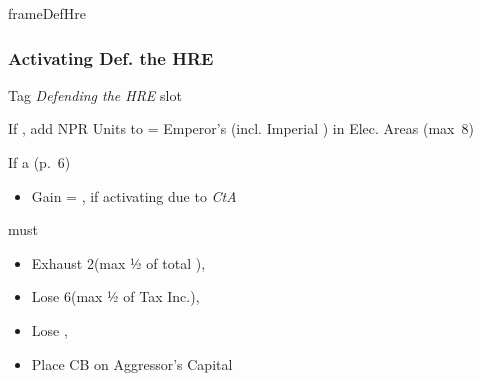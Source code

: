 \documentclass[10pt]{article}
\newlength{\fhDefHre} \setlength\fhDefHre{14\baselineskip}
\begin{document}
\begin{dynamiccontents*}{frameDefHre}
\begin{eubox}{\fhDefHre}
\begin{multicols}{2}
		\subsubsection*{Activating Def. the HRE }
		\begin{itemize}
			\item Tag \emph{Defending the HRE} slot
			\item If , add NPR Units to  \manpower = Emperor's \influence (incl. Imperial \influence) in Elec. Areas (max~8)
			{\botrules
			\item If a  (p.~6)
			\begin{itemize}
				\item Gain \botpower = \authority, if activating due to \emph{CtA}
			\end{itemize}
			}
			\item {} must
			\begin{itemize}
				\item Exhaust 2\manpower (max ½ of total \manpower), 
				\item Lose 6\ducats (max ½ of Tax Inc.), 
				\item Lose , 
				\item Place CB on Aggressor's Capital
			\end{itemize}
			\item {}
		\end{itemize}
	\end{multicols}
\end{eubox}\end{dynamiccontents*}
\end{document}
